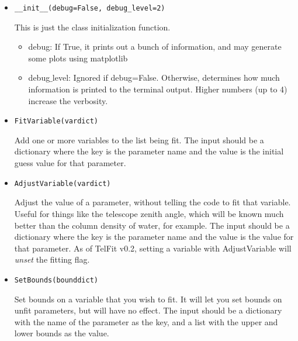\documentclass{article}
\begin{document}
\begin{itemize}

  \item \begin{Verbatim}[commandchars=\\\{\}]
__init__(debug=False, debug_level=2)
    \end{Verbatim}
    This is just the class initialization function.
  
  \begin{itemize}
    \item debug: If True, it prints out a bunch of information, and may generate some plots using matplotlib
    \item debug$\_$level: Ignored if debug=False. Otherwise, determines how much information is printed to the terminal output. Higher numbers (up to 4) increase the verbosity.
  \end{itemize}
  
  
  \item \begin{Verbatim}[commandchars=\\\{\}]
FitVariable(vardict)
    \end{Verbatim}
    Add one or more variables to the list being fit. The input should be a dictionary where the key is the parameter name and the value is the initial guess value for that parameter.
    
  \item \begin{Verbatim}[commandchars=\\\{\}]
AdjustVariable(vardict)
    \end{Verbatim}
    Adjust the value of a parameter, without telling the code to fit that variable. Useful for things like the telescope zenith angle, which will be known much better than the column density of water, for example. The input should be a dictionary where the key is the parameter name and the value is the  value for that parameter. As of TelFit v0.2, setting a variable with AdjustVariable will \emph{unset} the fitting flag. 
    
  \item \begin{Verbatim}[commandchars=\\\{\}]
SetBounds(bounddict)
    \end{Verbatim}
    Set bounds on a variable that you wish to fit. It will let you set bounds on unfit parameters, but will have no effect. The input should be a dictionary with the name of the parameter as the key, and a list with the upper and lower bounds as the value.
    

\end{itemize}
\end{document}
